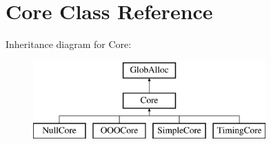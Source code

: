 \hypertarget{classCore}{\section{Core Class Reference}
\label{classCore}
}
Inheritance diagram for Core\-:\begin{figure}[H]
\begin{center}
\leavevmode
\includegraphics[height=3.000000cm]{classCore}
\end{center}
\end{figure}
